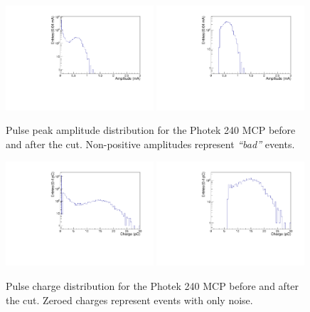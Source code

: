\documentclass[twocolumn,aps,prd,reprint,superscriptaddress,floatfix]{revtex4-1}
\begin{document}
\begin{figure}[!htb]
\centering
	\includegraphics[width=0.49\textwidth]{PhotekAmp.pdf}
	\includegraphics[width=0.49\textwidth]{PhotekAmpCut.pdf}
	\caption{Pulse peak amplitude distribution for the Photek 240 MCP before and after the cut.
		Non-positive amplitudes represent \textit{``bad''} events.}
	\label{fig:AmpCut}
\end{figure}

\begin{figure}[!htb]
\centering
	\includegraphics[width=0.49\textwidth]{PhotekCharge.pdf}
	\includegraphics[width=0.49\textwidth]{PhotekChargeCut.pdf}
	\caption{Pulse charge distribution for the Photek 240 MCP before and after the cut.
		Zeroed charges represent events with only noise.}
	\label{fig:ChargeCut}
\end{figure}
\end{document}
